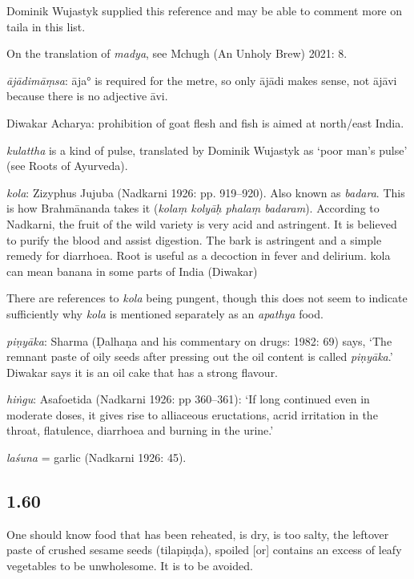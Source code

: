 \begin{ekdosis}
\begin{philcomm}[hp01_059]
Dominik Wujastyk supplied this reference and may be able to comment more on taila in this list.

On the translation of \emph{madya}, see Mchugh (An Unholy Brew) 2021: 8.

\emph{ājādimāṃsa}: āja° is required for the metre, so only ājādi makes sense, not ājāvi because there is no adjective āvi.

Diwakar Acharya: prohibition of goat flesh and fish is aimed at north/east India.

\emph{kulattha} is a kind of pulse, translated by Dominik Wujastyk as `poor man's pulse' (see Roots of Ayurveda).

\emph{kola}: Zizyphus Jujuba (Nadkarni 1926: pp. 919--920). Also known as \emph{badara}. This is how Brahmānanda takes it (\emph{kolaṃ kolyāḥ phalaṃ badaram}). According to Nadkarni, the fruit of the wild variety is very acid and astringent. It is believed to purify the blood and assist digestion. The bark is astringent and a simple remedy for diarrhoea. Root is useful as a decoction in fever and delirium.
kola can mean banana in some parts of India (Diwakar)

There are references to \emph{kola} being pungent, though this does not seem to indicate sufficiently why \emph{kola} is mentioned separately as an \emph{apathya} food.

\emph{piṇyāka}: Sharma (Ḍalhaṇa and his commentary on drugs: 1982: 69) says, ‘The remnant paste of oily seeds after pressing out the oil content is called \emph{piṇyāka}.’ Diwakar says it is an oil cake that has a strong flavour.

\emph{hiṅgu}: Asafoetida (Nadkarni 1926: pp 360–361): `If long continued even in moderate doses, it gives rise to alliaceous eructations, acrid irritation in the throat, flatulence, diarrhoea and burning in the urine.'

\emph{laśuna} = garlic (Nadkarni 1926: 45).
\end{philcomm}

\subsection*{1.60}
\begin{translation}[hp01_060]
One should know food that has been reheated, is dry, is too salty, the leftover paste of crushed sesame seeds (tilapiṇḍa), spoiled [or] contains an excess of leafy vegetables to be unwholesome. It is to be avoided.
\end{translation}


\end{ekdosis}
